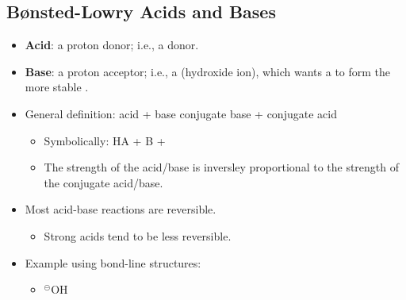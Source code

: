\documentclass[12pt,a4paper]{article}
\begin{document}
\subsection{B{\o}nsted-Lowry Acids and Bases}
\begin{itemize}
    \item \textbf{Acid}: a {\color{o-Sun}proton donor}; i.e., a {\color{pos}} donor.
    \item \textbf{Base}: a {\color{o-Sun}proton acceptor}; i.e., a {\color{neg}} (hydroxide ion), which wants a {\color{pos}} to form the more stable .
    \item General definition: {\color{pos}acid} + {\color{neg}base} \ch{<>} {\color{neg}conjugate base} + {\color{pos}conjugate acid}
        \begin{itemize}
            \item Symbolically: {\color{pos}HA} + {\color{neg}B} \ch{<>} {\color{neg}} + {\color{pos}}
            \item The strength of the acid/base is {\color{o-Sun}inversley proportional} to the strength of the conjugate acid/base.
        \end{itemize}
    \item Most acid-base reactions are reversible.
        \begin{itemize}
            \item Strong acids tend to be less reversible.
        \end{itemize}
    \item Example using bond-line structures:
        \begin{itemize}
            \item 
            \hspace{6pt}{\large+}\hspace{6pt}
            \hspace{6pt}{\large\ch{<>}}\hspace{6pt}
            {\color{neg}$^\circleddash$O}H
            \hspace{6pt}{\large+}\hspace{6pt}
    \end{itemize}

\end{itemize}
\end{document}
